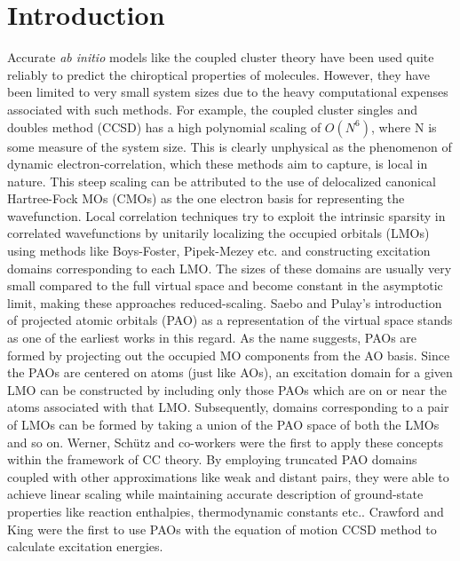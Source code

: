 \section{Introduction}
Accurate {\em ab initio} models like the coupled cluster theory have been used quite reliably to 
predict the chiroptical properties of molecules. However, they have been limited to very 
small system sizes due to the heavy computational expenses associated with such methods. 
For example, the coupled cluster singles and doubles method (CCSD) has a high polynomial scaling of 
$O(N^6)$, where N is some measure of the system size. This is clearly unphysical as the phenomenon 
of dynamic electron-correlation, which these methods aim to capture, is local in nature.\cite{Saebo86} This 
steep scaling can be attributed to the use of delocalized canonical Hartree-Fock MOs (CMOs) as the one 
electron basis for representing the wavefunction. Local correlation techniques try to exploit the intrinsic 
sparsity in correlated wavefunctions by unitarily localizing the occupied orbitals (LMOs) using methods 
like Boys-Foster, Pipek-Mezey\cite{BoughtonPulay93} etc. and constructing excitation domains corresponding to each LMO. 
The sizes of these domains are usually very small compared to the full virtual space and become constant 
in the asymptotic limit, making these approaches reduced-scaling. Saebo and Pulay's introduction of projected 
atomic orbitals (PAO) as a representation of the virtual space stands as one of the earliest works in this 
regard\cite{Saebo86,Pulay83,PulaySaebo93}. As the name suggests, PAOs are formed by projecting out the occupied MO components from the 
AO basis. Since the PAOs are centered on atoms (just like AOs), an excitation domain for a given LMO can 
be constructed by including only those PAOs which are on or near the atoms associated with that LMO. 
Subsequently, domains corresponding to a pair of LMOs can be formed by taking a union of the PAO space of both 
the LMOs and so on. Werner, Sch{\"u}tz and co-workers \cite{Schutz00a,Schutz00b,Schutz01} were the first to apply these concepts within 
the framework of CC theory. By employing truncated PAO domains coupled with other approximations like weak 
and distant pairs, they were able to achieve linear scaling while maintaining accurate description of 
ground-state properties like reaction enthalpies, thermodynamic constants etc.\cite{Hampel96, Schutz00a,Schutz00b,Schutz01,Saebo86,Pulay83,PulaySaebo93}. Crawford and King 
were the first to use PAOs with the equation of motion CCSD method to calculate excitation energies\cite{CrawfordKing02}. 

